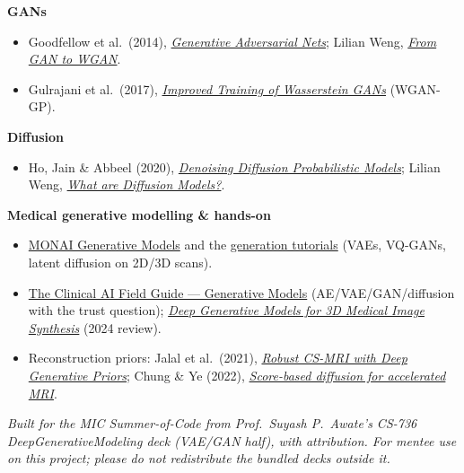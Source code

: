 \documentclass[11pt]{article}
\begin{document}
\textbf{GANs}
\begin{itemize}[nosep,leftmargin=*]
  \item Goodfellow et al.\ (2014), \href{https://arxiv.org/abs/1406.2661}{\emph{Generative Adversarial Nets}}; Lilian Weng, \href{https://lilianweng.github.io/posts/2017-08-20-gan/}{\emph{From GAN to WGAN}}.
  \item Gulrajani et al.\ (2017), \href{https://arxiv.org/abs/1704.00028}{\emph{Improved Training of Wasserstein GANs}} (WGAN-GP).
\end{itemize}

\textbf{Diffusion}
\begin{itemize}[nosep,leftmargin=*]
  \item Ho, Jain \& Abbeel (2020), \href{https://arxiv.org/abs/2006.11239}{\emph{Denoising Diffusion Probabilistic Models}}; Lilian Weng, \href{https://lilianweng.github.io/posts/2021-07-11-diffusion-models/}{\emph{What are Diffusion Models?}}.
\end{itemize}

\textbf{Medical generative modelling \& hands-on}
\begin{itemize}[nosep,leftmargin=*]
  \item \href{https://github.com/Project-MONAI/GenerativeModels}{MONAI Generative Models} and the \href{https://github.com/Project-MONAI/tutorials/tree/main/generation}{generation tutorials} (VAEs, VQ-GANs, latent diffusion on 2D/3D scans).
  \item \href{https://book.clinicalai.guide/chapters/07-generative-models.html}{The Clinical AI Field Guide --- Generative Models} (AE/VAE/GAN/diffusion with the trust question); \href{https://arxiv.org/pdf/2410.17664}{\emph{Deep Generative Models for 3D Medical Image Synthesis}} (2024 review).
  \item Reconstruction priors: Jalal et al.\ (2021), \href{https://arxiv.org/abs/2108.01368}{\emph{Robust CS-MRI with Deep Generative Priors}}; Chung \& Ye (2022), \href{https://www.sciencedirect.com/science/article/pii/S1361841522001268}{\emph{Score-based diffusion for accelerated MRI}}.
\end{itemize}

\vfill
\begin{center}\small\itshape
Built for the MIC Summer-of-Code from Prof.\ Suyash P.\ Awate's CS-736
DeepGenerativeModeling deck (VAE/GAN half), with attribution. For mentee use on
this project; please do not redistribute the bundled decks outside it.
\end{center}
\end{document}
